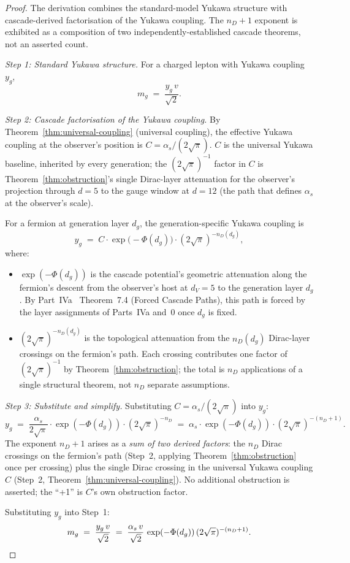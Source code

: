 \documentclass[12pt,a4paper]{article}
\begin{document}
\begin{proof}
The derivation combines the standard-model Yukawa structure with
cascade-derived factorisation of the Yukawa coupling. The $n_D + 1$
exponent is exhibited as a composition of two independently-established
cascade theorems, not an asserted count.

\emph{Step 1: Standard Yukawa structure.} For a charged lepton with
Yukawa coupling $y_g$,
\[
m_g \;=\; \frac{y_g\,v}{\sqrt{2}}.
\]

\emph{Step 2: Cascade factorisation of the Yukawa coupling.}
By Theorem~\ref{thm:universal-coupling} (universal coupling), the
effective Yukawa coupling at the observer's position is
$C = \alpha_s/(2\sqrt{\pi})$. $C$ is the universal Yukawa baseline,
inherited by every generation; the $(2\sqrt{\pi})^{-1}$ factor in $C$
is Theorem~\ref{thm:obstruction}'s single Dirac-layer attenuation for
the observer's projection through $d=5$ to the gauge window at
$d=12$ (the path that defines $\alpha_s$ at the observer's scale).

For a fermion at generation layer $d_g$, the generation-specific Yukawa
coupling is
\[
y_g \;=\; C \cdot \exp\bigl(-\Phi(d_g)\bigr) \cdot (2\sqrt{\pi})^{-n_D(d_g)},
\]
where:
\begin{itemize}[nosep]
\item $\exp(-\Phi(d_g))$ is the cascade potential's geometric attenuation
along the fermion's descent from the observer's host at $d_V=5$ to the
generation layer $d_g$. By Part~IVa~\cite{part4a} Theorem~7.4
(Forced Cascade Paths), this path is forced by the layer assignments
of Parts~IVa and~0 once $d_g$ is fixed.
\item $(2\sqrt{\pi})^{-n_D(d_g)}$ is the topological attenuation from
the $n_D(d_g)$ Dirac-layer crossings on the fermion's path. Each
crossing contributes one factor of $(2\sqrt{\pi})^{-1}$ by
Theorem~\ref{thm:obstruction}; the total is $n_D$ applications of a
single structural theorem, not $n_D$ separate assumptions.
\end{itemize}

\emph{Step 3: Substitute and simplify.}
Substituting $C = \alpha_s/(2\sqrt{\pi})$ into $y_g$:
\[
y_g \;=\; \frac{\alpha_s}{2\sqrt{\pi}} \cdot \exp(-\Phi(d_g)) \cdot (2\sqrt{\pi})^{-n_D}
\;=\; \alpha_s \cdot \exp(-\Phi(d_g)) \cdot (2\sqrt{\pi})^{-(n_D+1)}.
\]
The exponent $n_D + 1$ arises as a \emph{sum of two derived factors}:
the $n_D$ Dirac crossings on the fermion's path (Step~2, applying
Theorem~\ref{thm:obstruction} once per crossing) plus the single
Dirac crossing in the universal Yukawa coupling $C$ (Step~2,
Theorem~\ref{thm:universal-coupling}). No additional obstruction
is asserted; the ``+1'' is $C$'s own obstruction factor.

Substituting $y_g$ into Step~1:
\[
m_g \;=\; \frac{y_g\,v}{\sqrt{2}}
\;=\; \frac{\alpha_s\,v}{\sqrt{2}}\,\exp(-\Phi(d_g))\,(2\sqrt{\pi})^{-(n_D+1)}. \qedhere
\]
\end{proof}
\end{document}
